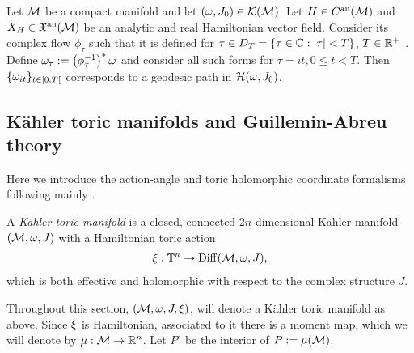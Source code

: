 \documentclass[notas.tex]{subfiles} 				%
\begin{document}
\begin{thm} \label{thm_complex_flow_geodesics}
	Let $\mathcal{M}$ be a compact manifold and let $(\omega, J_0) \in \mathcal{K}(\mathcal{M})$. Let $H \in C^{\text{an}}(\mathcal{M})$ and $X_H \in \mathfrak{X}^{\text{an}}(\mathcal{M})$ be an analytic and real Hamiltonian vector field. Consider its complex flow $\phi_\tau$ such that it is defined for $\tau \in D_T=\{\tau \in \mathbb{C} : \left|\tau\right| < T\}$, $T \in \mathbb{R}^+$ . Define $\omega_\tau := \left( \phi_\tau^{-1} \right)^* \omega$ and consider all such forms for $\tau = it, 0 \leq t < T$. Then $\{\omega_{it}\}_{t \in [0,T[}$ corresponds to a geodesic path in $\mathcal{H}(\omega, J_0)$.
\end{thm}

\subsection{Kähler toric manifolds and Guillemin-Abreu theory} \label{sec_coordinates}

	Here we introduce the action-angle and toric holomorphic coordinate formalisms following mainly \cite{abreu_kahler_2003}.

	\begin{defn} \label{def_ktoric_action}
		A \emph{Kähler toric manifold} is a closed, connected $2n$-dimensional Kähler manifold $(\mathcal{M},\omega,J)$ with a Hamiltonian toric action
		\begin{align*}
			\xi:\mathbb{T}^n\to\operatorname*{Diff}(\mathcal{M},\omega,J),
		\end{align*}
		which is both effective and holomorphic with respect to the complex structure $J$.
	\end{defn}


	Throughout this section, $(\mathcal{M},\omega,J,\xi)$, will denote a Kähler toric manifold as above. Since $\xi$ is Hamiltonian, associated to it there is a moment map, which we will denote by $\mu: \mathcal{M} \to \mathbb{R}^n$. Let $P^\circ$ be the interior of $P := \mu(\mathcal{M})$.
	
\end{document}
